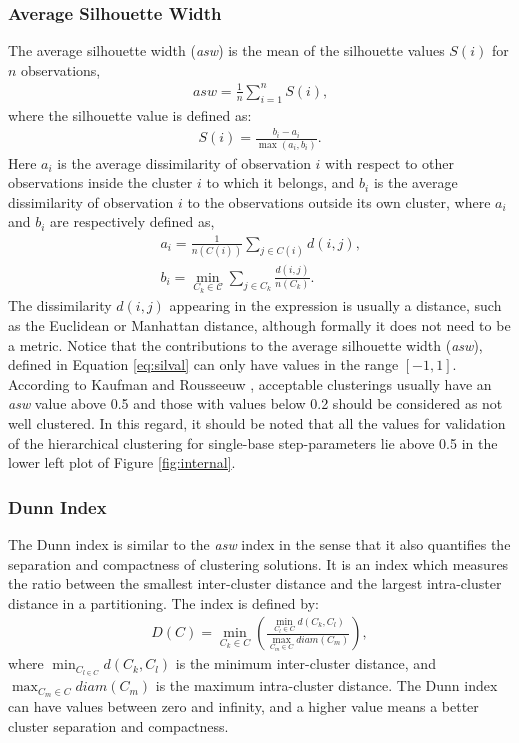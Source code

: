 \subsubsection{Average Silhouette Width}
The  average  silhouette  width  (\textit{asw})  is  the  mean  of  the
silhouette values $S(i)$ for $n$ observations,
\begin{gather}
\textit{asw} = \frac{1}{n} \sum_{i=1}^{n} S(i) \text{,}
\end{gather}  
where the silhouette value is defined as:
\begin{gather}
\label{eq:silval}  
S(i) = \frac{b_{i}-a_{i}}{\max(a_{i},b_{i})} \text{.}
\end{gather}
Here  $a_{i}$ is  the average  dissimilarity of  observation  $i$ with
respect  to other  observations inside  the  cluster $i$  to which  it
belongs, and  $b_{i}$ is the average dissimilarity  of observation $i$
to the observations outside its own cluster, where $a_i$ and $b_i$ are
respectively defined as,
\begin{gather}
a_{i} = \frac{1}{n(C(i))} \sum_{j \in C(i)} d(i,j) \text{,}\\
b_{i}     =    \min_{C_{k}     \in     \mathcal{C}}    \sum_{j     \in
  C_{k}}\frac{d(i,j)}{n(C_{k})} \text{.}
\end{gather}  
The dissimilarity  $d(i,j)$ appearing in  the expression is  usually a
distance,  such  as  the  Euclidean or  Manhattan  distance,  although
formally  it  does  not  need   to  be  a  metric.   Notice  that  the
contributions to the  average silhouette width (\textit{asw}), defined
in  Equation  \ref{eq:silval}  can  only  have  values  in  the  range
$[-1,1]$.  According to Kaufman and Rousseeuw \cite{kaufman1990},
acceptable clusterings  usually have  an \textit{asw} value  above 0.5
and  those with  values below  0.2 should  be considered  as  not well
clustered. In this regard, it should  be noted that all the values for
validation   of   the    hierarchical   clustering   for   single-base
step-parameters  lie  above 0.5  in  the  lower  left plot  of  Figure
\ref{fig:internal}.

\subsubsection{Dunn Index}
The Dunn index is similar to  the \textit{asw} index in the sense that
it  also  quantifies  the  separation and  compactness  of  clustering
solutions.  It  is an  index  which  measures  the ratio  between  the
smallest inter-cluster distance and the largest intra-cluster distance
in a partitioning.  The index is defined by:
\begin{gather}
D(C) = \min_{C_{k} \in C} \left(  \frac{\min_{C_{l} \in C}
  d(C_{k},C_{l})}{\max_{C_{m} \in C} diam(C_{m})} \right) ,
\end{gather}
where $\min_{C_{l \in C}} d(C_{k},C_{l})$ is the minimum inter-cluster
distance,  and  $\max_{C_{m}  \in   C}  diam(C_{m})$  is  the  maximum
intra-cluster distance.   The Dunn index can have  values between zero
and infinity, and a higher value means a better cluster separation and
compactness.

